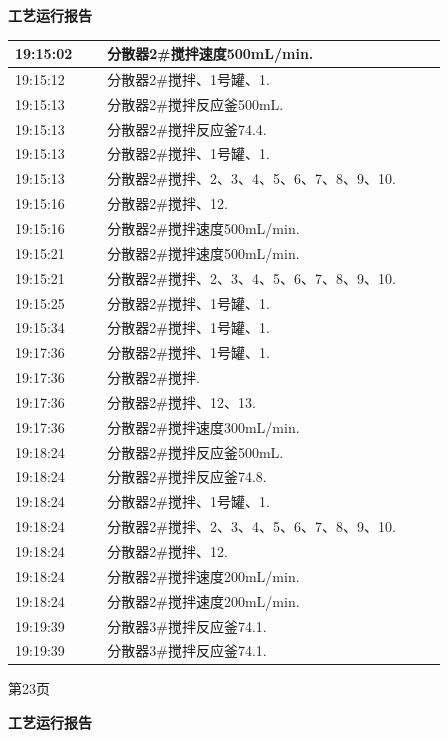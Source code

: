 \documentclass[UTF8,10pt,a4paper,fontset=fandol]{ctexart}
\begin{document}
\begin{center}
\begin{minipage}[t]{0.47\linewidth}
\centering
\textbf{工艺运行报告}

\vspace{2mm}
\scriptsize
\begin{tabular}{|p{0.19\linewidth}|p{0.70\linewidth}|}
\hline
19:15:02 & 分散器2#搅拌速度500mL/min. \\ \hline
19:15:12 & 分散器2#搅拌、1号罐、1. \\ \hline
19:15:13 & 分散器2#搅拌反应釜500mL. \\ \hline
19:15:13 & 分散器2#搅拌反应釜74.4. \\ \hline
19:15:13 & 分散器2#搅拌、1号罐、1. \\ \hline
19:15:13 & 分散器2#搅拌、2、3、4、5、6、7、8、9、10. \\ \hline
19:15:16 & 分散器2#搅拌、12. \\ \hline
19:15:16 & 分散器2#搅拌速度500mL/min. \\ \hline
19:15:21 & 分散器2#搅拌速度500mL/min. \\ \hline
19:15:21 & 分散器2#搅拌、2、3、4、5、6、7、8、9、10. \\ \hline
19:15:25 & 分散器2#搅拌、1号罐、1. \\ \hline
19:15:34 & 分散器2#搅拌、1号罐、1. \\ \hline
19:17:36 & 分散器2#搅拌、1号罐、1. \\ \hline
19:17:36 & 分散器2#搅拌. \\ \hline
19:17:36 & 分散器2#搅拌、12、13. \\ \hline
19:17:36 & 分散器2#搅拌速度300mL/min. \\ \hline
19:18:24 & 分散器2#搅拌反应釜500mL. \\ \hline
19:18:24 & 分散器2#搅拌反应釜74.8. \\ \hline
19:18:24 & 分散器2#搅拌、1号罐、1. \\ \hline
19:18:24 & 分散器2#搅拌、2、3、4、5、6、7、8、9、10. \\ \hline
19:18:24 & 分散器2#搅拌、12. \\ \hline
19:18:24 & 分散器2#搅拌速度200mL/min. \\ \hline
19:18:24 & 分散器2#搅拌速度200mL/min. \\ \hline
19:19:39 & 分散器3#搅拌反应釜74.1. \\ \hline
19:19:39 & 分散器3#搅拌反应釜74.1. \\ \hline
\end{tabular}

\vspace{2mm}
{\tiny 第23页}
\end{minipage}
\hfill
\begin{minipage}[t]{0.47\linewidth}
\centering
\textbf{工艺运行报告}


\end{minipage}
\end{center}
\end{document}
